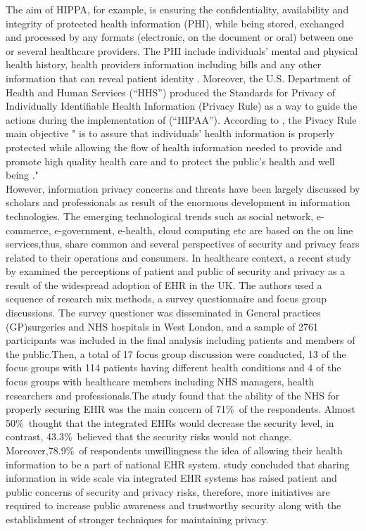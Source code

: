 The aim of HIPPA, for example, is ensuring the confidentiality, availability and integrity of protected health information (PHI), while being stored, exchanged and processed by any formats (electronic, on the document or oral) between one or several healthcare providers. The PHI include individuals' mental and physical health history, health providers information including bills and any other information that can reveal patient identity \cite{U.S.DepartmentofHealthandHumanServices,Rahim2016,Andriole2014a}.
Moreover, the U.S. Department of Health and Human Services (“HHS”) produced the Standards for Privacy of Individually Identifiable Health Information (Privacy Rule) as a way to guide the actions during the implementation of (“HIPAA”). According to \cite{U.S.DepartmentofHealthandHumanServices}, the Pivacy Rule main objective " is to assure that individuals’ health information is properly protected while allowing the flow of health information needed to provide and promote high quality health care and to protect the public's health and well being ."
\\
However, information privacy concerns and threats have been largely discussed by scholars and professionals as result of the enormous development in information technologies. The emerging technological trends such as social network, e-commerce, e-government, e-health, cloud computing etc are based on the on line services,thus, share common and several perspectives of security and privacy fears related to their operations and consumers. In healthcare context, a recent study by \citet{Papoutsi2015} examined the perceptions of patient and public of security and privacy as a result of the widespread adoption of EHR in the UK. The authors used a sequence of research mix methods, a survey questionnaire and focus group discussions. The survey questioner was disseminated in General practices (GP)surgeries and NHS hospitals in West London, and a sample of 2761 participants was included in the final analysis including patients and members of the public.Then, a total of 17 focus group discussion were conducted, 13 of the focus groups with 114 patients having different health conditions and 4 of the focus groups with healthcare members including NHS managers, health researchers and professionals.The study found that the ability of the NHS for properly securing EHR was the main concern of 71\%\ of the respondents.  Almost 50\%\ thought that the integrated EHRs would decrease the security level, in contrast, 43.3\%\ believed that the security risks would not change. Moreover,78.9\%\ of respondents unwillingness the idea of allowing their health information to be a part of national EHR system. \citet{Papoutsi2015}study concluded that sharing information in wide scale via integrated EHR systems has raised patient and public concerns of security and privacy risks, therefore, more initiatives are required to increase public awareness and trustworthy security along with the establishment of stronger techniques for maintaining privacy.

